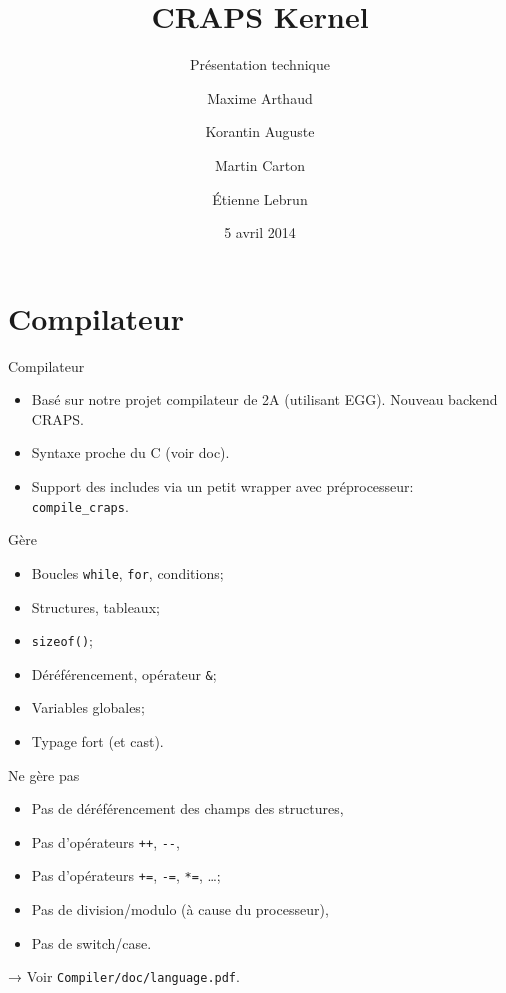 \documentclass{beamer}
\title{CRAPS Kernel}
\subtitle{Présentation technique}
\author{
       Maxime Arthaud
  \and Korantin Auguste
  \and Martin Carton
  \and Étienne Lebrun
}
\date{5 avril 2014}
\begin{document}
  \begin{frame}
    \titlepage%
  \end{frame}

  \section{Compilateur}
    \begin{frame}[fragile]{Compilateur}
      \begin{itemize}
        \item Basé sur notre projet compilateur de 2A (utilisant EGG). Nouveau
          backend CRAPS.
        \item Syntaxe proche du C (voir doc).
        \item Support des includes via un petit wrapper avec préprocesseur:
          \verb+compile_craps+.
      \end{itemize}
\end{frame}

    \begin{frame}[fragile]{Gère}
      \begin{itemize}
        \item Boucles \verb+while+, \verb+for+, conditions;
        \item Structures, tableaux;
        \item \verb+sizeof()+;
        \item Déréférencement, opérateur \verb+&+;
        \item Variables globales;
        \item Typage fort (et cast).
      \end{itemize}
\end{frame}

    \begin{frame}[fragile]{Ne gère pas}
      \begin{itemize}
        \item Pas de déréférencement des champs des structures,
        \item Pas d'opérateurs \verb|++|, \verb|--|,
        \item Pas d'opérateurs \verb|+=|, \verb|-=|, \verb|*=|, \dots;
        \item Pas de division/modulo (à cause du processeur),
        \item Pas de switch/case.
      \end{itemize}

      \pause
      → Voir \verb+Compiler/doc/language.pdf+.
\end{frame}
\end{document}
